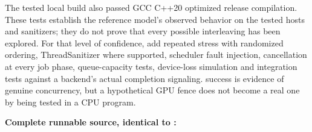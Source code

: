 The tested local build also passed GCC C++20 optimized release compilation. These tests establish the reference model's observed behavior on the tested hosts and sanitizers; they do not prove that every possible interleaving has been explored. For that level of confidence, add repeated stress with randomized ordering, ThreadSanitizer where supported, scheduler fault injection, cancellation at every job phase, queue-capacity tests, device-loss simulation and integration tests against a backend's actual completion signaling.  success is evidence of genuine concurrency, but a hypothetical GPU fence does not become a real one by being tested in a CPU program.

\textbf{Complete runnable source, identical to :}

